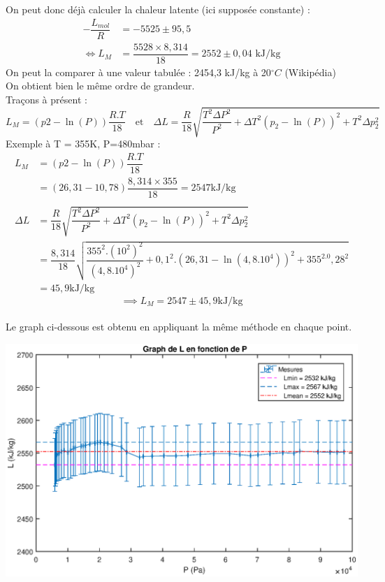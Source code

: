\documentclass[12pt,a4paper]{article}
\begin{document}
\begin{itemize}
On peut donc déjà calculer la chaleur latente (ici supposée constante) : \\
\begin{align*}
-\dfrac{L_{mol}}{R}&=-5525\pm95,5\\
 \iff L_{M}&=\dfrac{5528\times8,314}{18}=2552\pm0,04 \text{ kJ/kg}
\end{align*} 
On peut la comparer à une valeur tabulée : 2454,3 kJ/kg à 20$ ^\circ C$ (Wikipédia)\\
On obtient bien le même ordre de grandeur.\\
Traçons à présent : $$L_{M}=(p2-\ln(P))\dfrac{R.T}{18} \quad \text{et} \quad
\Delta L = \dfrac{R}{18} \sqrt{\dfrac{T^2 \Delta P^2}{P^2}+\Delta T^2 (p_2-\ln (P))^2+T^2 \Delta p_2^2}$$
Exemple à T = 355K, P=480mbar : 
\begin{align*}
L_{M}&=(p2-\ln(P))\dfrac{R.T}{18}\\
&=(26,31-10,78)\dfrac{8,314\times355}{18}=2547 \text{kJ/kg}\\ 
\\
\Delta L &=\dfrac{R}{18} \sqrt{\dfrac{T^2 \Delta P^2}{P^2}+\Delta T^2 (p_2-\ln (P))^2+T^2 \Delta p_2^2}\\
&=\dfrac{8,314}{18} \sqrt{\dfrac{355^2.(10^2)^2}{(4,8.10^4)^2}+0,1^2 . (26,31-\ln (4,8.10^4))^2+355^2.0,28^2}\\
&=45,9 \text{kJ/kg}
\end{align*}
$$\implies \boxed{L_M = 2547\pm45,9\text{kJ/kg}}$$\\
Le graph ci-dessous est obtenu en appliquant la même méthode en chaque point. 
\begin{bigcenter}
\includegraphics[scale=0.7]{L}
\end{bigcenter}
\end{itemize}
\end{document}
